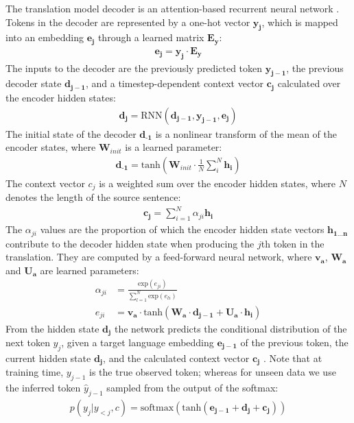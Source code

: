 The translation model decoder is an attention-based recurrent neural network \citep{Bahdanau2015}. Tokens in the decoder are 
represented by a one-hot vector $\mathbf{y_j}$, which is mapped into an embedding  $\mathbf{e_j}$ through a learned matrix $\mathbf{E_y}$:
%
\begin{align}
	\mathbf{e_j} = \mathbf{y_j} \cdot \mathbf{E_y} 
\end{align}
%
The inputs to the decoder are the previously predicted token $\mathbf{y_{j-1}}$, the previous decoder state $\mathbf{d_{j-1}}$, 
and a timestep-dependent context vector $\mathbf{c_j}$ calculated over the encoder hidden states:
%
\begin{align}
    \mathbf{d_j} = \text{RNN}(\mathbf{d_{j-1}}, \mathbf{y_{j-1}},
    \mathbf{e_j})
\end{align}
%
The initial state of the decoder $\mathbf{d_{\text{-1}}}$ is a nonlinear transform of the mean of the encoder states, where $\mathbf{W}_{init}$ is a learned parameter:
%
\begin{align}
	\mathbf{d_{\text{-1}}} = \text{tanh}(\mathbf{W}_{init} \cdot \frac{1}{N} \sum_{i}^{N}
    \mathbf{h_i})\label{eqn:decoder_init}
\end{align}
%
The context vector $c_j$ is a weighted sum over the encoder hidden states, where $N$ denotes the length of the source sentence:
\begin{align}
	\mathbf{c_j} = \sum_{i=1}^{N} \alpha_{ji}\mathbf{h_i} 
\end{align}
%
The $\alpha_{ji}$ values are the proportion of which the encoder hidden state vectors $\mathbf{ h_{1 \ldots n}}$ contribute to the decoder hidden state 
when producing the $j$th token in the translation. They are computed by a feed-forward neural network, where $\mathbf{v_a}$, 
$\mathbf{W_a}$ and $\mathbf{U_a}$ are learned parameters:
%
\begin{align}
	\alpha_{ji} &= \frac{\text{exp}(e_{ji})}{\sum_{l=1}^{N} \text{exp}(e_{li})}\\[1ex]
	e_{ji} &= \mathbf{v_a} \cdot \text{tanh}( \mathbf{W_{a}} \cdot \mathbf{d_{j-1}}  + \mathbf{U_{a}}  \cdot \mathbf{h_i} )
\end{align}
%
From the hidden state $\mathbf{d_{j}}$ the network predicts the conditional distribution of the next token $y_{j}$, given a target 
language embedding $\mathbf{e_{j-1}}$ of the previous token, the current hidden state $\mathbf{d_j}$, and the calculated context vector 
$\mathbf{c_j}$ . Note that at training time, $y_{j-1}$ is the 
true observed token; whereas for unseen data we use the inferred token $\hat{y}_{j-1}$ sampled from the output of the softmax:
%
\begin{align}
p(y_{j}|y_{<j}, c) = \text{softmax}(\text{tanh}( \mathbf{e_{j-1}}  + \mathbf{d_j}  + \mathbf{c_j} ))
\end{align}

